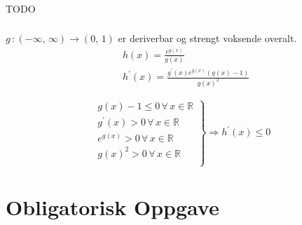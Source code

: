 \documentclass[defaultpackages]{cheatsheet}
\begin{document}
	\subsubsection{}
	TODO
	\subsubsection{}
	$g \,\colon (-\infty,\,\infty) \to (0,\,1)$ er deriverbar og strengt voksende overalt.
	\begin{align*}
		&h(x) = \frac{e^{g(x)}}{g(x)}\\
		&h^\prime(x) = \frac{g^\prime(x)e^{g(x)}(g(x)-1)}{g(x)^2}
	\end{align*}

	\[
	 \left.
	\begin{array}{ll}
		g(x)- 1 \le 0\,\forall\,x \in \mathbb{R}\\
		g^\prime(x) > 0\,\forall\,x \in \mathbb{R}\\
		e^{g(x)} > 0\,\forall\,x \in \mathbb{R}\\
		g(x)^2 > 0\,\forall\,x \in \mathbb{R}\\
	\end{array}
	\right \}\Rightarrow h^\prime(x)\le 0 \]


	\section{Obligatorisk Oppgave} %

\subsection{} %
\end{document}
